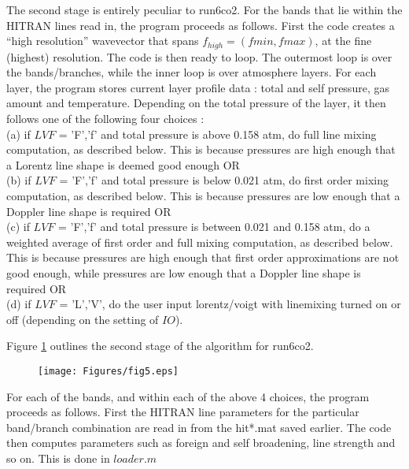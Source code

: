 \documentclass[11pt]{article}
\begin{document}
The second stage is entirely peculiar to run6co2. For the bands that lie 
within the HITRAN lines read in, the program proceeds as follows. First the 
code creates a ``high resolution'' wavevector that spans 
$f_{high}=(fmin,fmax)$, at 
the fine (highest) resolution. The code is then ready to loop. The
outermost loop is over the bands/branches, while the inner loop is over 
atmosphere layers. For each layer, the program stores current layer profile 
data : total and self pressure, gas amount and temperature. Depending on 
the total pressure of the layer, it then follows one of the following four 
choices : \\
(a) if $LVF$  = 'F','f' and total pressure is above 0.158 atm, do full line
    mixing computation, as described below. This is because pressures are
    high enough that a Lorentz line shape is deemed good enough OR\\
(b) if $LVF$  = 'F','f' and total pressure is below 0.021 atm, do first 
    order
    mixing computation, as described below. This is because pressures are
    low enough that a Doppler line shape is required OR\\
(c) if $LVF$  = 'F','f' and total pressure is between 0.021 and 0.158 atm, 
    do a weighted average of first order and full mixing computation, as 
    described below. This is because pressures are high enough that first 
    order approximations are not good enough, while pressures are low 
    enough 
    that a Doppler line shape is required OR \\
(d) if $LVF$ = 'L','V', do the user input lorentz/voigt with linemixing 
    turned on or off (depending on the setting of $IO$).

Figure \ref{fig:PQRloop_CO2} outlines the second stage of the algorithm for 
run6co2.

\begin{figure}[h]
  \begin{center}\texttt{[image: Figures/fig5.eps]}
  \end{center}
  \caption[Outline of PQR band loop details for CO2]{}
  \label{fig:PQRloop_CO2}
\end{figure}

For each of the bands, and within each of the above 4 choices, the program 
proceeds as follows. First the HITRAN line parameters for the particular 
band/branch combination are read in from the hit*.mat saved earlier. The 
code then computes parameters such as foreign and self broadening, line 
strength and so on. This is done in $loader.m$ 
\end{document}

